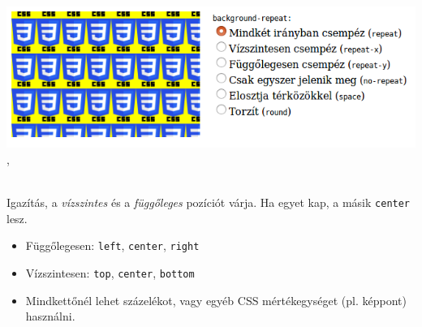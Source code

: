 \begin{frame}
  \begin{center}
    \includegraphics[width=.75\textwidth]{hatter.png}\\
    , 
  \end{center}
\end{frame}

\begin{frame}
  \begin{description}[m]
    \item[\texttt{background-position}] \hfill \\ Igazítás, a 
      \emph{vízszintes} és a \emph{függőleges} pozíciót várja. Ha egyet 
      kap, a másik \texttt{center} lesz.
      \begin{itemize}
        \item Függőlegesen: \texttt{left}, \texttt{center}, 
        \texttt{right}
        \item Vízszintesen: \texttt{top}, \texttt{center}, 
        \texttt{bottom}
        \item Mindkettőnél lehet százelékot, vagy egyéb CSS 
        mértékegységet (pl. képpont) használni. 
      \end{itemize}
  \end{description}
\end{frame}

\begin{frame}
  \begin{exampleblock}{}
    \fontsize{7}{8} \selectfont
    
    
    
    
    
  \end{exampleblock}
\end{frame}

